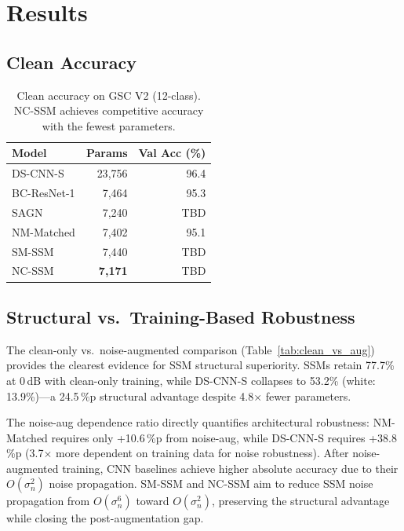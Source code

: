 \documentclass[journal]{IEEEtran}
\begin{document}
\section{Results}
\label{sec:results}

\subsection{Clean Accuracy}

\begin{table}[t]
\centering
\caption{Clean accuracy on GSC V2 (12-class). NC-SSM achieves competitive accuracy with the fewest parameters.}
\label{tab:clean}
\small
\begin{tabular}{lrr}
\toprule
\textbf{Model} & \textbf{Params} & \textbf{Val Acc (\%)} \\
\midrule
DS-CNN-S & 23{,}756 & 96.4 \\
BC-ResNet-1 & 7{,}464 & 95.3 \\
SAGN & 7{,}240 & TBD \\
\midrule
NM-Matched & 7{,}402 & 95.1 \\
SM-SSM & 7{,}440 & TBD \\
NC-SSM & \textbf{7{,}171} & TBD \\
\bottomrule
\end{tabular}
\end{table}


\subsection{Structural vs.\ Training-Based Robustness}
\label{sec:struct_vs_train}

The clean-only vs.\ noise-augmented comparison (Table~\ref{tab:clean_vs_aug}) provides the clearest evidence for SSM structural superiority.
SSMs retain 77.7\% at 0\,dB with clean-only training, while DS-CNN-S collapses to 53.2\% (white: 13.9\%)---a 24.5\,\%p structural advantage despite 4.8$\times$ fewer parameters.

The noise-aug dependence ratio directly quantifies architectural robustness: NM-Matched requires only +10.6\,\%p from noise-aug, while DS-CNN-S requires +38.8\,\%p (3.7$\times$ more dependent on training data for noise robustness).
After noise-augmented training, CNN baselines achieve higher absolute accuracy due to their $O(\sigma_n^2)$ noise propagation.
SM-SSM and NC-SSM aim to reduce SSM noise propagation from $O(\sigma_n^6)$ toward $O(\sigma_n^2)$, preserving the structural advantage while closing the post-augmentation gap.
\end{document}
